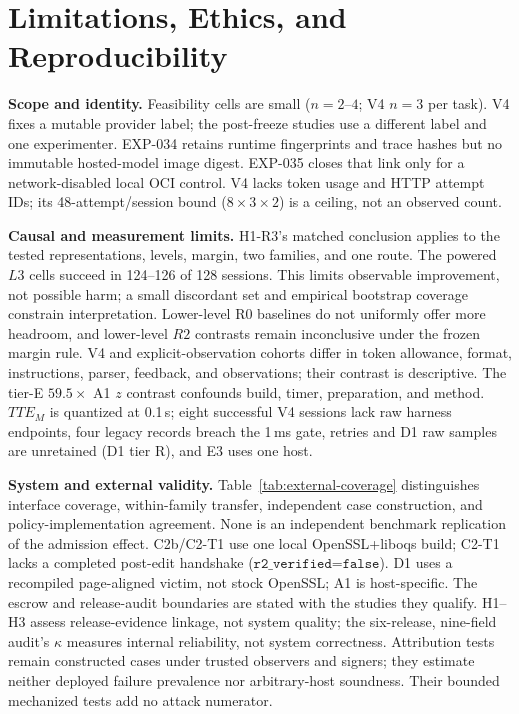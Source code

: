 \section{Limitations, Ethics, and Reproducibility}\label{sec:limits}

\textbf{Scope and identity.} Feasibility cells are small ($n=2$--$4$;
V4 $n=3$ per task). V4 fixes a mutable provider label; the post-freeze
studies use a different label and one experimenter. EXP-034 retains runtime
fingerprints and trace hashes but no immutable hosted-model image digest.
EXP-035 closes that link only for a network-disabled local OCI control.
V4 lacks token usage and HTTP attempt IDs; its 48-attempt/session bound
($8\times3\times2$) is a ceiling, not an observed count.

\textbf{Causal and measurement limits.} H1-R3's matched conclusion applies
to the tested representations, levels, margin, two families, and one route. The
powered $L3$ cells succeed in 124--126 of 128 sessions. This limits observable
improvement, not possible harm; a small discordant set and empirical bootstrap
coverage constrain interpretation. Lower-level R0 baselines do not uniformly
offer more headroom, and lower-level $R2$ contrasts remain inconclusive under
the frozen margin rule.
V4 and explicit-observation cohorts differ in token allowance, format,
instructions, parser, feedback, and observations; their contrast is
descriptive. The tier-E $59.5\times$ A1 $z$ contrast confounds build, timer,
preparation, and method. $TTE_M$ is quantized at 0.1\,s; eight successful V4
sessions lack raw harness endpoints, four legacy records breach the 1\,ms
gate, retries and D1 raw samples are unretained (D1 tier R), and E3 uses one host.

\textbf{System and external validity.} Table~\ref{tab:external-coverage}
distinguishes interface coverage, within-family transfer, independent case
construction, and policy-implementation agreement. None is an independent
benchmark replication of the admission effect. C2b/C2-T1 use one local
OpenSSL+liboqs build; C2-T1 lacks a completed post-edit handshake
($\texttt{r2\_verified=false}$). D1 uses a recompiled page-aligned victim,
not stock OpenSSL; A1 is host-specific. The escrow and release-audit
boundaries are stated with the studies they qualify. H1--H3 assess
release-evidence linkage, not system quality;
the six-release, nine-field audit's $\kappa$ measures internal reliability,
not system correctness. Attribution tests remain constructed cases under
trusted observers and signers; they estimate neither deployed failure
prevalence nor arbitrary-host soundness. Their bounded mechanized tests add
no attack numerator.

